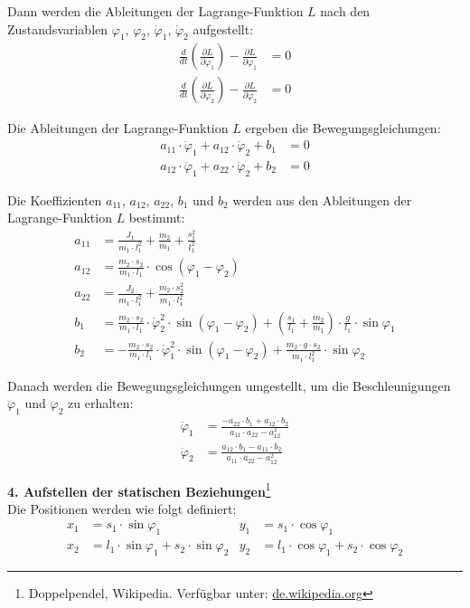 Dann werden die Ableitungen der Lagrange-Funktion $L$ nach den Zustandsvariablen $\varphi_1$, $\varphi_2$, $\dot{\varphi}_1$, $\dot{\varphi}_2$ aufgestellt:
\begin{align}
\frac{d}{dt}\left(\frac{\partial L}{\partial \dot{\varphi}_1}\right) - \frac{\partial L}{\partial \varphi_1} &= 0 \\
\frac{d}{dt}\left(\frac{\partial L}{\partial \dot{\varphi}_2}\right) - \frac{\partial L}{\partial \varphi_2} &= 0
\end{align}

Die Ableitungen der Lagrange-Funktion $L$ ergeben die Bewegungsgleichungen:
\begin{align}
a_{11} \cdot \ddot{\varphi}_1 + a_{12} \cdot \ddot{\varphi}_2 + b_1 &= 0 \\
a_{12} \cdot \ddot{\varphi}_1 + a_{22} \cdot \ddot{\varphi}_2 + b_2 &= 0
\end{align}

Die Koeffizienten $a_{11}$, $a_{12}$, $a_{22}$, $b_1$ und $b_2$ werden aus den Ableitungen der Lagrange-Funktion $L$ bestimmt:
\begin{align}
a_{11} &= \frac{J_1}{m_1 \cdot l_1^2} + \frac{m_2}{m_1} + \frac{s_1^2}{l_1^2} \\
a_{12} &= \frac{m_2 \cdot s_2}{m_1 \cdot l_1} \cdot \cos(\varphi_1 - \varphi_2) \\
a_{22} &= \frac{J_2}{m_1 \cdot l_1^2} + \frac{m_2 \cdot s_2^2}{m_1 \cdot l_1^2} \\
b_1 &= \frac{m_2 \cdot s_2}{m_1 \cdot l_1} \cdot \dot{\varphi}_2^2 \cdot \sin(\varphi_1 - \varphi_2) + \left( \frac{s_1}{l_1} + \frac{m_2}{m_1} \right) \cdot \frac{g}{l_1} \cdot \sin\varphi_1 \\
b_2 &= -\frac{m_2 \cdot s_2}{m_1 \cdot l_1} \cdot \dot{\varphi}_1^2 \cdot \sin(\varphi_1 - \varphi_2) + \frac{m_2 \cdot g \cdot s_2}{m_1 \cdot l_1^2} \cdot \sin\varphi_2
\end{align}

Danach werden die Bewegungsgleichungen umgestellt, um die Beschleunigungen $\ddot{\varphi}_1$ und $\ddot{\varphi}_2$ zu erhalten:
\begin{align}
\ddot{\varphi}_1 &= \frac{-a_{22} \cdot b_1 + a_{12} \cdot b_2}{a_{11} \cdot a_{22} - a_{12}^2} \\
\ddot{\varphi}_2 &= \frac{a_{12} \cdot b_1 - a_{11} \cdot b_2}{a_{11} \cdot a_{22} - a_{12}^2}
\end{align}

\textbf{4. Aufstellen der statischen Beziehungen}\footnote{Doppelpendel, Wikipedia. Verfügbar unter: \href{https://de.wikipedia.org/w/index.php?title=Doppelpendel&oldid=251882175}{de.wikipedia.org}}\\
Die Positionen werden wie folgt definiert:
\begin{align}
x_1 &= s_1 \cdot \sin\varphi_1 & y_1 &= s_1 \cdot \cos\varphi_1 \\
x_2 &= l_1 \cdot \sin\varphi_1 + s_2 \cdot \sin\varphi_2 & y_2 &= l_1 \cdot \cos\varphi_1 + s_2 \cdot \cos\varphi_2
\end{align}

